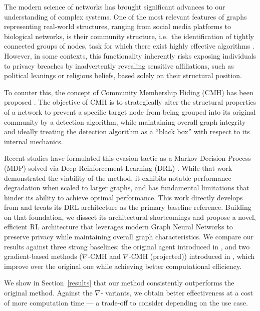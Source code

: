\documentclass[a4paper]{article}
\begin{document}
The modern science of networks has brought significant advances to our
understanding of complex systems. One of the most relevant features of graphs
representing real-world structures, ranging from social media platforms to
biological networks, is their community structure, i.e.\ the identification of
tightly connected groups of nodes, task for which there exist highly effective
algorithms \parencite{Fortunato-2010}. However, in some contexts, this
functionality inherently risks exposing individuals to privacy breaches by
inadvertently revealing sensitive affiliations, such as political leanings or
religious beliefs, based solely on their structural position.

To counter this, the concept of Community Membership Hiding (CMH) has been
proposed \parencite{bernini-2024}. The objective of CMH is to strategically
alter the structural properties of a network to prevent a specific target node
from being grouped into its original community by a detection algorithm, while
maintaining overall graph integrity and ideally treating the detection algorithm
as a ``black box'' with respect to its internal mechanics.

Recent studies have formulated this evasion tactic as a Markov Decision Process
(MDP) solved via Deep Reinforcement Learning (DRL) \parencite{bernini-2024}.
While that work demonstrated the viability of the method, it exhibits notable
performance degradation when scaled to larger graphs, and has fundamental
limitations that hinder its ability to achieve optimal performance. This work
directly develops from \parencite{bernini-2024} and treats its DRL architecture
as the primary baseline reference. Building on that foundation, we dissect its
architectural shortcomings and propose a novel, efficient RL architecture that
leverages modern Graph Neural Networks to preserve privacy while maintaining
overall graph characteristics. We compare our results against three strong
baselines: the original agent introduced in \parencite{bernini-2024}, and two
gradient-based methods ($\nabla$-CMH and $\nabla$-CMH (projected)) introduced
in \parencite{silvestri2025righthidemaskingcommunity}, which improve over the
original one while achieving better computational efficiency.

We show in Section~\ref{results} that our method consistently outperforms the
original method. Against the $\nabla$- variants, we obtain better effectiveness
at a cost of more computation time --- a trade-off to consider depending on the
use case.
\end{document}
